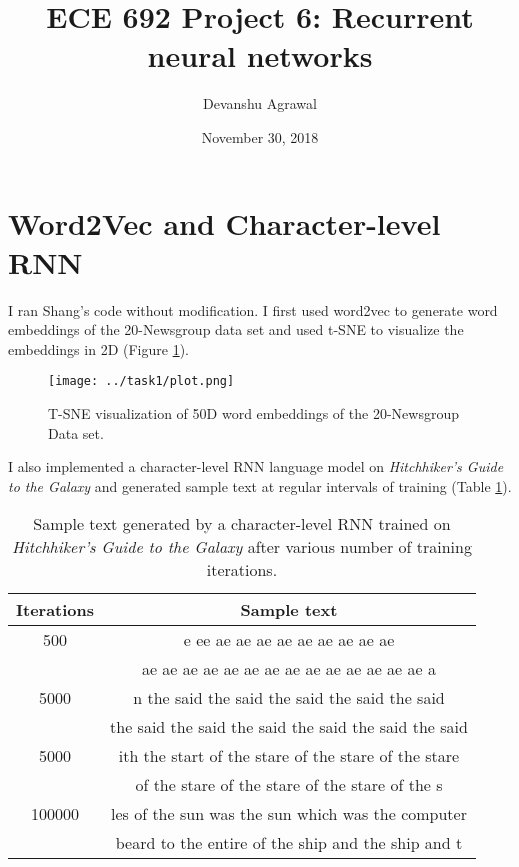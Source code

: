 \documentclass[11pt]{article}
\title{ECE 692 Project 6: Recurrent neural networks}
\author{Devanshu Agrawal}
\date{November 30, 2018}
\begin{document}
\maketitle

\section{Word2Vec and Character-level RNN}

I ran Shang's code without modification. I first used word2vec to generate word embeddings of the 20-Newsgroup data set and used t-SNE to visualize the embeddings in 2D (Figure \ref{fig-tsne1}).

\begin{figure}
\centering
\texttt{[image: ../task1/plot.png]}
\caption{\label{fig-tsne1} T-SNE visualization of 50D word embeddings of the 20-Newsgroup Data set.}
\end{figure}

I also implemented a character-level RNN language model on \textit{Hitchhiker's Guide to the Galaxy} and generated sample text at regular intervals of training (Table \ref{table-sample1}).

\begin{table}
\centering
\caption{\label{table-sample1} Sample text generated by a character-level RNN trained on \textit{Hitchhiker's Guide to the Galaxy} after various number of training iterations.}
\begin{tabular}{|c|c|} \hline
Iterations & Sample text \\ \hline
500 & e  ee  ae  ae  ae  ae  ae  ae  ae  ae  ae  \\
\quad & ae  ae  ae  ae  ae  ae  ae  ae  ae  ae  ae  ae  ae  ae  a \\ \hline
5000 & n the said the said the said the said the said \\
\quad & the said the said the said the said the said the said \\ \hline
5000 & ith the start of the stare of the stare of the stare \\
\quad & of the stare of the stare of the stare of the s \\ \hline
100000 & les of the sun was the sun which was the computer \\
\quad & beard to the entire of the ship and the ship and t \\
\hline
\end{tabular}
\end{table}
\end{document}
